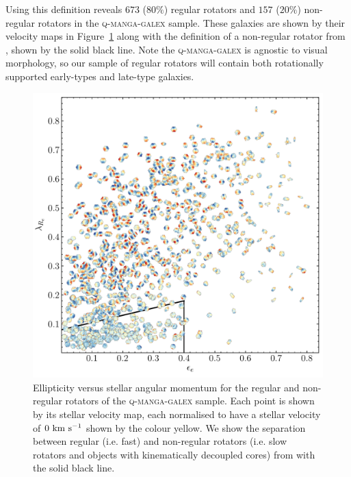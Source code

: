 \documentclass[useAMS,usenatbib]{mn2e}
\begin{document}
Using this definition reveals $673$ ($80\%$) regular rotators and $157$ ($20\%$) non-regular rotators in the \textsc{q-manga-galex} sample.  These galaxies are shown by their velocity maps in Figure~\ref{fig:evsl} along with the definition of a non-regular rotator from \cite{cappellari16}, shown by the solid black line. Note the \textsc{q-manga-galex} is agnostic to visual morphology, so our sample of regular rotators will contain both rotationally supported early-types and late-type galaxies. 

\begin{figure}
\centering
\includegraphics[width=\textwidth]{../figures/nonSF_FR_SR_sample_orig_cmap_vel_maps.pdf}
\caption{Ellipticity versus stellar angular momentum for the regular and non-regular rotators of the \textsc{q-manga-galex} sample. Each point is shown by its stellar velocity map, each normalised to have a stellar velocity of $0~\rm{km}~\rm{s}^{-1}$ shown by the colour yellow. We show the separation between regular (i.e. fast) and non-regular rotators (i.e. slow rotators and objects with kinematically decoupled cores) from \protect\cite{cappellari16} with the solid black line.}
\label{fig:evsl}
\end{figure}  
\end{document}
